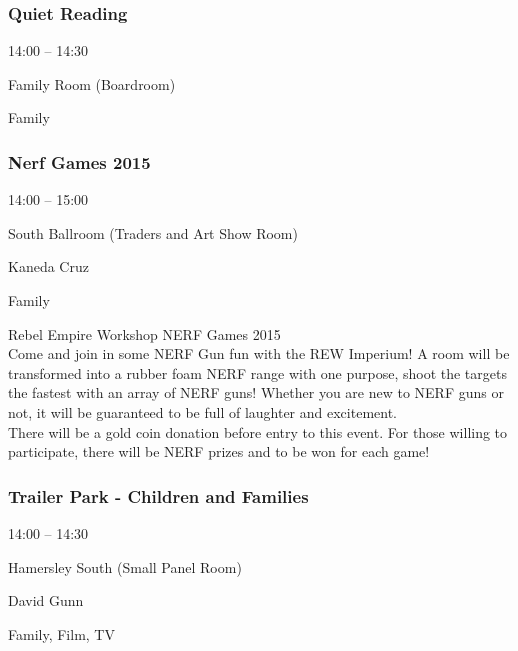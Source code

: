 \documentclass{scrreprt}
\begin{document}
\begin{multicols}{2}
\subsubsection*{Quiet Reading}\begin{description}
\setlength{\itemsep}{0pt}
\setlength{\parsep}{0pt}
\setlength{\parskip}{0pt}
\item[Time:]{14:00 -- 14:30}
\item[Venue:]{Family Room (Boardroom)}
\item[Tags:]{Family}\end{description}

\subsubsection*{Nerf Games 2015}\begin{description}
\setlength{\itemsep}{0pt}
\setlength{\parsep}{0pt}
\setlength{\parskip}{0pt}
\item[Time:]{14:00 -- 15:00}
\item[Venue:]{South Ballroom (Traders and Art Show Room)}
\item[People:]{Kaneda Cruz}
\item[Tags:]{Family}\end{description}
Rebel Empire Workshop NERF Games 2015\\Come and join in some NERF Gun fun with the REW Imperium! A room will be transformed into a rubber foam NERF range with one purpose, shoot the targets the fastest with an array of NERF guns! Whether you are new to NERF guns or not, it will be guaranteed to be full of laughter and excitement.\\There will be a gold coin donation before entry to this event. For those willing to participate, there will be  NERF prizes and to be won for each game!
\subsubsection*{Trailer Park - Children and Families}\begin{description}
\setlength{\itemsep}{0pt}
\setlength{\parsep}{0pt}
\setlength{\parskip}{0pt}
\item[Time:]{14:00 -- 14:30}
\item[Venue:]{Hamersley South (Small Panel Room)}
\item[People:]{David Gunn}
\item[Tags:]{Family, Film, TV}\end{description}


\end{multicols}
\end{document}
